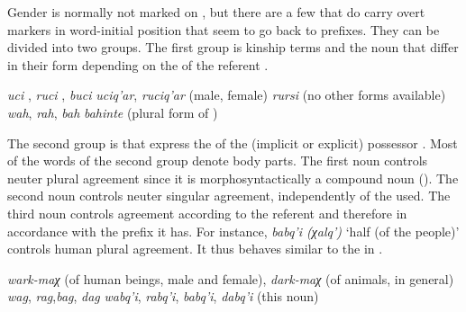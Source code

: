 Gender is normally not marked on , but there are a few  that do carry overt  markers in word-initial position that seem to go back to  prefixes. They can be divided into two groups. The first group is kinship terms and the noun  that differ in their form depending on the  of the referent . 
%
\begin{exe}
	\ex	\label{ex:nounsovertgendermarkers}
	\begin{xlist}
		\ex	\textit{uc{\lmk}i} , \textit{ruc{\lmk}i} , \textit{buc{\lmk}i} 
		\ex	\textit{uc{\lmk}iq'ar}, \textit{ruc{\lmk}iq'ar}  (male, female)
		\ex	\textit{rurs{\lmk}i}  (no other forms available)
		\ex	\textit{wah}, \textit{rah}, \textit{bah} 
		\ex	\textit{bahinte}  (plural form of )
	\end{xlist}
	\end{exe}
	
The second group is  that express the  of the (implicit or explicit) possessor . Most of the words of the second group denote body parts. The first noun controls neuter plural agreement since it is morphosyntactically a compound noun (). The second noun controls neuter singular agreement, independently of the  used. The third noun controls agreement according to the referent and therefore in accordance with the prefix it has. For instance, \textit{babq'i (χalq')} `half (of the people)' controls human plural agreement. It thus behaves similar to the  in .
	
\begin{exe}	
		\ex	\label{ex:nounsovertgendermarkers2}
	\begin{xlist}
		\ex	\textit{wark-maχ}  (of human beings, male and female), \textit{dark-maχ}  (of animals, in general) 
		\ex	\textit{wag}, \textit{rag},\textit{bag}, \textit{dag} \sqt{middle, waist}
		\ex	\textit{wabq'i},\textit{ rabq'i}, \textit{babq'i},\textit{ dabq'i}  (this noun)
	\end{xlist}
\end{exe}

